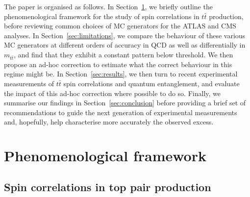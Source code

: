 \documentclass[aps,prd,twocolumn,floatfix,superscriptaddress,longbibliography,10pt]{revtex4-2}
\newcommand{\ttbar}{{\ensuremath{t\bar{t}}}\xspace}
\newcommand{\mttbar}{\ensuremath{m_{\ttbar}}\xspace}
\begin{document}
The paper is organised as follows.
In Section~\ref{sec:framework}, we briefly outline the phenomenological framework for the study of spin correlations in \ttbar production, before reviewing common choices of MC generators for the ATLAS and CMS analyses.
In Section~\ref{sec:limitations}, we compare the behaviour of these various MC generators at different orders of accuracy in QCD as well as differentially in \mttbar, and find that they exhibit a constant pattern below threshold.
We then propose an ad-hoc correction to estimate what the correct behaviour in this regime might be.
In Section~\ref{sec:results}, we then turn to recent experimental measurements of \ttbar spin correlations and quantum entanglement, and evaluate the impact of this ad-hoc correction where possible to do so.
Finally, we summarise our findings in Section~\ref{sec:conclusion} before providing a brief set of recommendations to guide the next generation of experimental measurements and, hopefully, help characterise more accurately the observed excess.

\section{Phenomenological framework}
\label{sec:framework}
\subsection{Spin correlations in top pair production}
\end{document}
